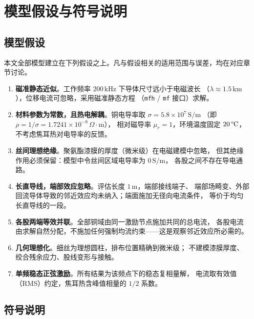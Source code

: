 \documentclass[12pt, a4paper]{ctexart}
\newcommand{\U}[1]{\ensuremath{\,\mathrm{#1}}}
\newcommand{\Uohmm}{\ensuremath{\,\Omega\cdot\mathrm{m}}}%
\newcommand{\UdegC}{\ensuremath{\,\text{\textdegree}\mathrm{C}}}%
\begin{document}
\section{模型假设与符号说明}

\subsection{模型假设}

本文全部模型建立在下列假设之上。凡与假设相关的适用范围与误差，均在对应章节讨论。

\begin{enumerate}[label=\textbf{假设\arabic*}, leftmargin=4.6em, itemsep=3pt]
\item \textbf{磁准静态近似}。工作频率 $200\U{kHz}$ 下导体尺寸远小于电磁波长
（$\lambda \approx 1.5\U{km}$），位移电流可忽略，采用磁准静态方程
（\texttt{mfh} / \texttt{mf} 接口）求解。
\item \textbf{材料参数为常数，且热电解耦}。铜电导率取 $\sigma = 5.8\times10^{7}\U{S/m}$
（即 $\rho = 1/\sigma = 1.7241\times10^{-8}\Uohmm$），
相对磁导率 $\mu_r = 1$，环境温度固定 $20\UdegC$，不考虑焦耳热对电导率的反馈。
\item \textbf{丝间理想绝缘}。聚氨酯漆膜的厚度（微米级）在电磁建模中忽略，
但其绝缘作用必须保留：模型中令丝间区域电导率为 $0\U{S/m}$，
各股之间不存在导电通路。
\item \textbf{长直导线，端部效应忽略}。评估长度 $1\U{m}$，端部接线端子、
端部场畸变、外部回流导体导致的邻近效应均未纳入；端面施加无径向电流条件，
等价于均匀长直导线的一段。
\item \textbf{各股两端等效并联}。全部铜域由同一激励节点施加共同的总电流，
各股电流由求解自然分配，不施加任何强制均流约束——这是观察邻近效应所必需的。
\item \textbf{几何理想化}。细丝为理想圆柱，排布位置精确到微米级；
不建模漆膜厚度、绞合残余应力、股线变形与接触。
\item \textbf{单频稳态正弦激励}。所有结果为该频点下的稳态复相量解，
电流取有效值（RMS）约定，焦耳热含峰值相量的 $1/2$ 系数。
\end{enumerate}

\subsection{符号说明}
\end{document}
